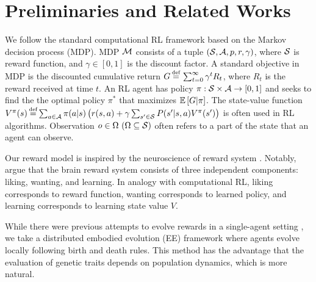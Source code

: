 \section{Preliminaries and Related Works}\label{sec:related}
We follow the standard computational RL framework \citep{suttonReinforcementLearningIntroduction2018} based on the Markov decision process (MDP). MDP $\mathcal{M}{}$ consists of a tuple $(\mathcal{S}{}, \mathcal{A}{}, p, r, \gamma)$, where $\mathcal{S}{}$ is reward function, and $\gamma \in [0, 1]$ is the discount factor. A standard objective in MDP is the discounted cumulative return $G \defequal{} \sum_{t=0}^{\infty}\gamma^t R_{t}$, where $R_t$ is the reward received at time $t$. An RL agent has policy $\pi: \mathcal{S} \times \mathcal{A} \rightarrow [0, 1]$ and seeks to find the the optimal policy $\pi^{*}$ that maximizes $\mathbb{E} \left[G|\pi\right]$. The state-value function $V^\pi(s) \defequal \sum_{a \in \A} \pi(a|s) \left( r(s, a) + \gamma \sum_{s' \in \X} P(s'|s, a) V^\pi(s') \right)$ is often used in RL algorithms. Observation $o \in \Omega~(\Omega \subseteq \mathcal{S})$ often refers to a part of the state that an agent can observe.

Our reward model is inspired by the neuroscience of reward system \citep{schultzNeuronalRewardDecision2015, berridgePleasureSystemsBrain2015}. Notably, \citet{berridgeDissectingComponentsReward2009} argue that the brain reward system consists of three independent components: liking, wanting, and learning. In analogy with computational RL, liking corresponds to reward function, wanting corresponds to learned policy, and learning corresponds to learning state value $V$. %

While
there were previous attempts to evolve rewards in a single-agent setting \citep{singhWhereRewardsCome2009,niekumEvolutionRewardFunctions2011,zhengWhatCanLearned2020},
we take a distributed embodied evolution (EE) framework \citep{watsonEmbodiedEvolutionDistributing2002,bredecheEmbodiedEvolutionCollective2018}
where agents evolve locally following birth and death rules. This method has the advantage that the evaluation of genetic traits depends on population dynamics, which is more natural.

